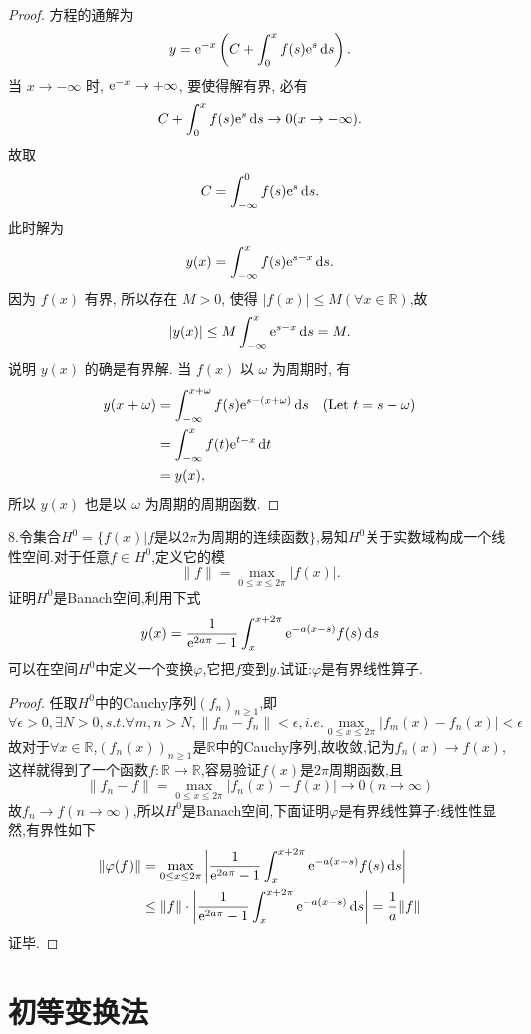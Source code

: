 \begin{proof}
  方程的通解为
  \[y=\mathrm{e}^{-x}\left(C+\int_0^xf(s)\mathrm{e}^s\mathop{}\!\mathrm{d} s\right).\]
  当 $x\to-\infty$ 时, $\mathrm{e}^{-x}\to+\infty$, 要使得解有界, 必有
  \[C+\int_0^xf(s)\mathrm{e}^s\mathop{}\!\mathrm{d} s\to0(x\to-\infty).\]
  故取
  \[C = \int_{-\infty}^0f(s)\mathrm{e}^s\mathop{}\!\mathrm{d} s.\]
  此时解为
  \[y(x)=\int_{-\infty}^xf(s)\mathrm{e}^{s-x}\mathop{}\!\mathrm{d} s.\]
  因为 $f(x)$ 有界, 所以存在 $M>0$, 使得 $|f(x)|\leq M(\forall x\in\mathbb{R})$,故
  \[|y(x)|\leq M\int_{-\infty}^x\mathrm{e}^{s-x}\mathop{}\!\mathrm{d} s = M.\]
  说明 $y(x)$ 的确是有界解. 当 $f(x)$ 以 $\omega$ 为周期时, 有
  \begin{align*}
    y(x+\omega)
    & = \int_{-\infty}^{x+\omega}f(s)\mathrm{e}^{s-(x+\omega)}\mathop{}\!\mathrm{d} s\quad(\text{Let }t=s-\omega) \\
    & = \int_{-\infty}^xf(t)\mathrm{e}^{t-x}\mathop{}\!\mathrm{d} t \\
    & = y(x),
  \end{align*}
  所以 $y(x)$ 也是以 $\omega$ 为周期的周期函数.
\end{proof}


8.令集合$H^0=\{f(x)|f\mbox{是以}2\pi\mbox{为周期的连续函数}\}$,易知$H^0$关于实数域构成一个线性空间.对于任意$f\in H^0$,定义它的模
\[\|f\|=\max_{0\leq x\leq 2\pi}|f(x)|.\]
证明$H^0$是Banach空间,利用下式
\[y(x)=\frac{1}{\mathrm{e}^{2a\pi}-1}\int_x^{x+2\pi}\mathrm{e}^{-a(x-s)}f(s)\mathop{}\!\mathrm{d} s\]
可以在空间$H^0$中定义一个变换$\varphi$,它把$f$变到$y$.试证:$\varphi$是有界线性算子.

\begin{proof}任取$H^0$中的Cauchy序列$(f_n)_{n\geq1}$,即
\[\forall\epsilon>0,\exists N>0,s.t.\forall m,n>N,\|f_m-f_n\|<\epsilon,i.e.\max_{0\leq x\leq2\pi}|f_m(x)-f_n(x)|<\epsilon\]
故对于$\forall x\in\mathbb{R}$,$\left(f_n(x)\right)_{n\geq1}$是$\mathbb{R}$中的Cauchy序列,故收敛,记为$f_n(x)\to f(x)$,这样就得到了一个函数$f:\mathbb{R}\to\mathbb{R}$,容易验证$f(x)$是$2\pi$周期函数,且
\[\|f_n-f\|=\max_{0\leq x\leq2\pi}|f_n(x)-f(x)|\to0(n\to\infty)\]
故$f_n\to f(n\to\infty)$,所以$H^0$是Banach空间,下面证明$\varphi$是有界线性算子:线性性显然,有界性如下
\[\begin{split}
\|\varphi(f)\|
&=\max_{0\leq x\leq2\pi}\left|\frac{1}{\mathrm{e}^{2a\pi}-1}\int_x^{x+2\pi}\mathrm{e}^{-a(x-s)}f(s)\mathop{}\!\mathrm{d} s\right|\\
&\leq\|f\|\cdot\left|\frac{1}{\mathrm{e}^{2a\pi}-1}\int_x^{x+2\pi}\mathrm{e}^{-a(x-s)}\mathop{}\!\mathrm{d} s\right|=\frac{1}{a}\|f\|
\end{split}\]
证毕.
\end{proof}


\section{初等变换法}


